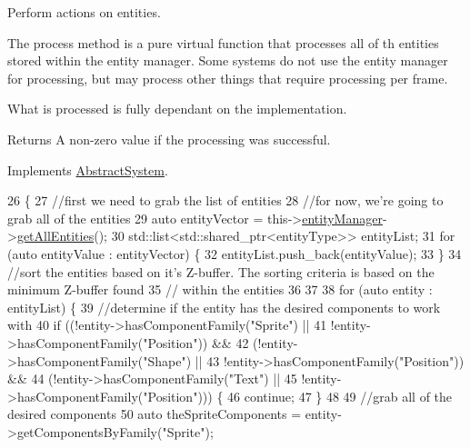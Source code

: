 Perform actions on entities. 

The process method is a pure virtual function that processes all of th entities stored within the entity manager. Some systems do not use the entity manager for processing, but may process other things that require processing per frame.

What is processed is fully dependant on the implementation.

\begin{DoxyReturn}{Returns}
A non-\/zero value if the processing was successful. 
\end{DoxyReturn}


Implements \hyperlink{class_abstract_system_af8bfe74feb5df2b5e3fff67bfe1106b9}{Abstract\-System}.


\begin{DoxyCode}
26                           \{
27     \textcolor{comment}{//first we need to grab the list of entities}
28     \textcolor{comment}{//for now, we're going to grab all of the entities}
29     \textcolor{keyword}{auto} entityVector = this->\hyperlink{class_abstract_system_ac0d16e94f5cea4b1a6bf489d35d7a14d}{entityManager}->\hyperlink{class_entity_manager_a452113e422a9c501bb008761f7609e33}{getAllEntities}();
30     std::list<std::shared\_ptr<entityType>> entityList;
31     \textcolor{keywordflow}{for} (\textcolor{keyword}{auto} entityValue : entityVector) \{
32         entityList.push\_back(entityValue);
33     \}
34     \textcolor{comment}{//sort the entities based on it's Z-buffer. The sorting criteria is based on the minimum Z-buffer found}
35     \textcolor{comment}{// within the entities}
36     
37 
38     \textcolor{keywordflow}{for} (\textcolor{keyword}{auto} entity : entityList) \{
39         \textcolor{comment}{//determine if the entity has the desired components to work with}
40         \textcolor{keywordflow}{if} ((!entity->hasComponentFamily(\textcolor{stringliteral}{"Sprite"}) ||
41             !entity->hasComponentFamily(\textcolor{stringliteral}{"Position"})) &&
42             (!entity->hasComponentFamily(\textcolor{stringliteral}{"Shape"}) ||
43             !entity->hasComponentFamily(\textcolor{stringliteral}{"Position"})) &&
44             (!entity->hasComponentFamily(\textcolor{stringliteral}{"Text"}) ||
45             !entity->hasComponentFamily(\textcolor{stringliteral}{"Position"}))) \{
46             \textcolor{keywordflow}{continue};
47         \}
48 
49         \textcolor{comment}{//grab all of the desired components}
50         \textcolor{keyword}{auto} theSpriteComponents = entity->getComponentsByFamily(\textcolor{stringliteral}{"Sprite"});

\end{DoxyCode}
